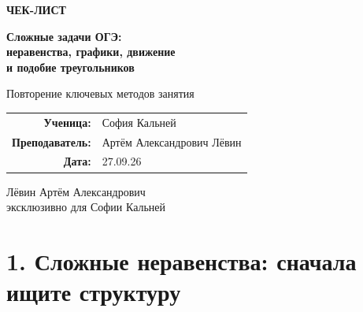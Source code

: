 \documentclass[a4paper,12pt]{article}
\begin{document}

\begin{titlepage}
\thispagestyle{empty}

\vspace*{24mm}

\begin{center}

{\Large\color{darkaccent}\bfseries ЧЕК-ЛИСТ}

\vspace{9mm}

{\huge\bfseries
Сложные задачи ОГЭ:\\[3mm]
неравенства, графики, движение\\
и подобие треугольников}

\vspace{12mm}

{\large
Повторение ключевых методов занятия
}

\vspace{22mm}

\begin{tabular}{rl}
\textbf{Ученица:} & София Кальней \\[3mm]
\textbf{Преподаватель:} & Артём Александрович Лёвин \\[3mm]
\textbf{Дата:} & 27.09.26
\end{tabular}

\vfill

{\large\color{darkaccent}
Лёвин Артём Александрович\\
эксклюзивно для Софии Кальней
}

\vspace{18mm}


\end{center}

\end{titlepage}


\section*{\color{darkaccent}
1. Сложные неравенства: сначала ищите структуру
}
\end{document}
